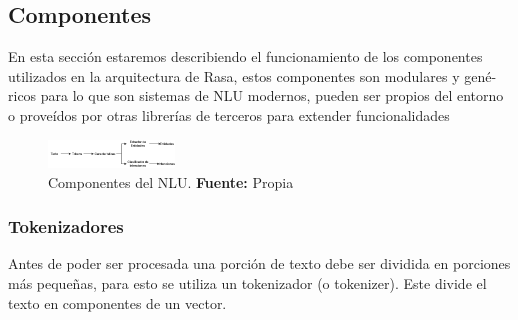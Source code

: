 \subsection{Componentes}
En esta sección estaremos describiendo el funcionamiento de los componentes
utilizados en la arquitectura de Rasa, estos componentes son modulares y gené-
ricos para lo que son sistemas de NLU modernos, pueden ser propios del entorno
o proveídos por otras librerías de terceros para extender funcionalidades
\begin{figure}[H]
\begin{centering}
\includegraphics[angle=0,width=0.3\textwidth]{Figuras/Componentes_NLU.png}
\par \end{centering}
\caption[Componentes del NLU]{Componentes del NLU. \textbf{Fuente:} Propia}
\label{Estructura}
\end{figure}
\subsubsection{Tokenizadores}
Antes de poder ser procesada una porción de texto debe ser dividida en porciones más pequeñas, para esto se utiliza 
un tokenizador (o tokenizer).   Este divide el texto en componentes de un vector.
